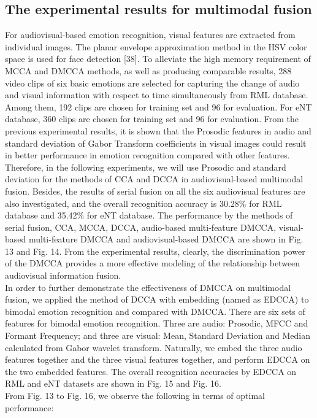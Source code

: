 \documentclass[journal]{IEEEtran}
\begin{document}
\subsection{The experimental results for multimodal fusion}
For audiovisual-based emotion recognition, visual features are extracted from individual images. The planar envelope approximation method in the HSV color space is used for face detection [38]. To alleviate the high memory requirement of MCCA and DMCCA methods, as well as producing comparable results, 288 video clips of six basic emotions are selected for capturing the change of audio and visual information with respect to time simultaneously from RML database. Among them, 192 clips are chosen for training set and 96 for evaluation. For eNT database, 360 clips are chosen for training set and 96 for evaluation. From the previous experimental results, it is shown that the Prosodic features in audio and standard deviation of Gabor Transform coefficients in visual images could result in better performance in emotion recognition compared with other features. Therefore, in the following experiments, we will use Prosodic and standard deviation for the methods of CCA and DCCA in audiovisual-based multimodal fusion. Besides, the results of serial fusion on all the six audiovisual features are also investigated, and the overall recognition accuracy is 30.28$\%$ for RML database and 35.42$\%$ for eNT database. The performance by the methods of serial fusion, CCA, MCCA, DCCA, audio-based multi-feature DMCCA, visual-based multi-feature DMCCA and audiovisual-based DMCCA are shown in Fig. 13 and Fig. 14. From the experimental results, clearly, the discrimination power of the DMCCA provides a more effective modeling of the relationship between audiovisual information fusion.\\\indent In order to further demonstrate the effectiveness of DMCCA on multimodal fusion, we applied the method of DCCA with embedding (named as EDCCA) to bimodal emotion recognition and compared with DMCCA. There are six sets of features for bimodal emotion recognition. Three are audio: Prosodic, MFCC and Formant Frequency; and three are visual: Mean, Standard Deviation and Median calculated from Gabor wavelet transform. Naturally, we embed the three audio features together and the three visual features together, and perform EDCCA on the two embedded features. The overall recognition accuracies by EDCCA on RML and eNT datasets are shown in Fig. 15 and Fig. 16. \\\indent From Fig. 13 to Fig. 16, we observe the following in terms of optimal performance:\\
\end{document}
